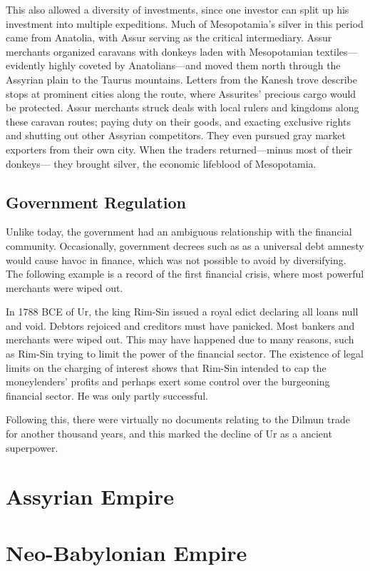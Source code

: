 \documentclass{article}
\begin{document}
    This also allowed a diversity of investments, since one investor can split up his investment into multiple expeditions. Much of Mesopotamia’s silver in this period came from Anatolia, with Assur serving as the critical intermediary. Assur merchants organized caravans with donkeys laden with Mesopotamian textiles—evidently highly coveted by Anatolians—and moved them north through the Assyrian plain to the Taurus mountains. Letters from the Kanesh trove describe stops at prominent cities along the route, where Assurites’ precious cargo would be protected. Assur merchants struck deals with local rulers and kingdoms along these caravan routes; paying duty on their goods, and exacting exclusive rights and shutting out other Assyrian competitors. They even pursued gray market exporters from their own city. When the traders returned—minus most of their donkeys— they brought silver, the economic lifeblood of Mesopotamia.

  \subsection{Government Regulation}

    Unlike today, the government had an ambiguous relationship with the financial community. Occasionally, government decrees such as as a universal debt amnesty would cause havoc in finance, which was not possible to avoid by diversifying. The following example is a record of the first financial crisis, where most powerful merchants were wiped out. 

    \begin{example}
      In 1788 BCE of Ur, the king Rim-Sin issued a royal edict declaring all loans null and void. Debtors rejoiced and creditors must have panicked. Most bankers and merchants were wiped out. This may have happened due to many reasons, such as Rim-Sin trying to limit the power of the financial sector. The existence of legal limits on the charging of interest shows that Rim-Sin intended to cap the moneylenders’ profits and perhaps exert some control over the burgeoning financial sector. He was only partly successful.

      Following this, there were virtually no documents relating to the Dilmun trade for another thousand years, and this marked the decline of Ur as a ancient superpower. 
    \end{example}

\section{Assyrian Empire}

\section{Neo-Babylonian Empire}
\end{document}

